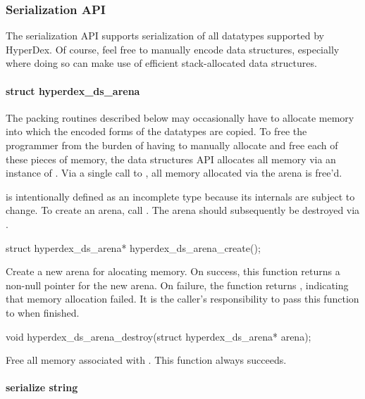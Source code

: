 \subsubsection{Serialization API}

The serialization API supports serialization of all datatypes supported by
HyperDex.  Of course, feel free to manually encode data structures, especially
where doing so can make use of efficient stack-allocated data structures.

\paragraph{struct hyperdex\_ds\_arena}

The packing routines described below may occasionally have to allocate memory
into which the encoded forms of the datatypes are copied.  To free the
programmer from the burden of having to manually allocate and free each of these
pieces of memory, the data structures API allocates all memory via an instance
of .  Via a single call to
, all memory allocated via the arena is
free'd.

 is intentionally defined as an incomplete type
because its internals are subject to change.  To create an arena, call
.  The arena should subsequently be destroyed
via .

\begin{ccode}
struct hyperdex_ds_arena* hyperdex_ds_arena_create();
\end{ccode}
\funcdesc Create a new arena for alocating memory.  On success, this function
returns a non-null pointer for the new arena.  On failure, the function returns
, indicating that memory allocation failed.  It is the caller's
responsibility to pass this function to  when
finished.

\funcsep
\begin{ccode}
void hyperdex_ds_arena_destroy(struct hyperdex_ds_arena* arena);
\end{ccode}
\funcdesc Free all memory associated with .  This function always
succeeds.

\paragraph{serialize string}

